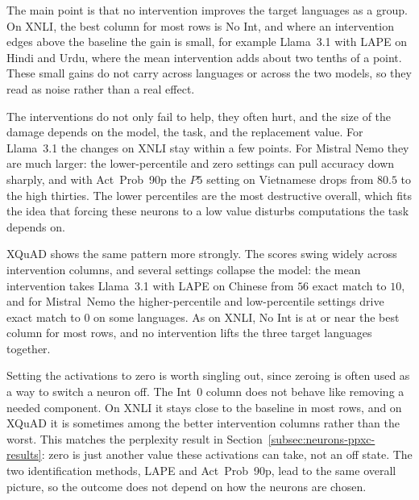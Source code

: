The main point is that no intervention improves the target languages as a group.
On XNLI, the best column for most rows is No Int, and where an intervention edges
above the baseline the gain is small, for example Llama~3.1 with LAPE on Hindi and
Urdu, where the mean intervention adds about two tenths of a point. These small
gains do not carry across languages or across the two models, so they read as noise
rather than a real effect.

The interventions do not only fail to help, they often hurt, and the size of the
damage depends on the model, the task, and the replacement value. For Llama~3.1 the
changes on XNLI stay within a few points. For Mistral Nemo they are much larger: the
lower-percentile and zero settings can pull accuracy down sharply, and with
Act~Prob~90p the $P5$ setting on Vietnamese drops from $80.5$ to the high thirties.
The lower percentiles are the most destructive overall, which fits the idea that
forcing these neurons to a low value disturbs computations the task depends on.

XQuAD shows the same pattern more strongly. The scores swing widely across
intervention columns, and several settings collapse the model: the mean
intervention takes Llama~3.1 with LAPE on Chinese from $56$ exact match to $10$,
and for Mistral~Nemo the higher-percentile and low-percentile settings drive
exact match to $0$ on some languages. As on XNLI, No Int is at or near the best
column for most rows, and no intervention lifts the three target languages together.

Setting the activations to zero is worth singling out, since zeroing is often used
as a way to switch a neuron off. The Int~0 column does not behave like removing a
needed component. On XNLI it stays close to the baseline in most rows, and on XQuAD
it is sometimes among the better intervention columns rather than the worst. This
matches the perplexity result in Section~\ref{subsec:neurons-ppxc-results}: zero is
just another value these activations can take, not an off state. The two
identification methods, LAPE and Act~Prob~90p, lead to the same overall picture, so
the outcome does not depend on how the neurons are chosen.

